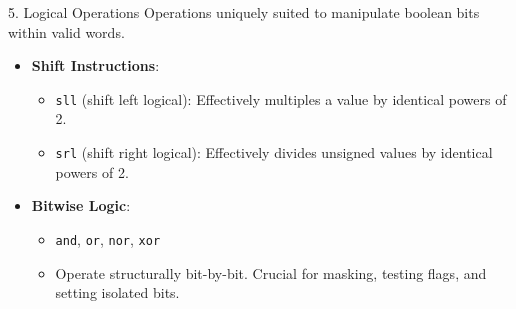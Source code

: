 \documentclass[aspectratio=169]{beamer}
\begin{document}
\begin{frame}{5. Logical Operations}
Operations uniquely suited to manipulate boolean bits within valid words.
\vspace{0.3cm}
\begin{itemize}
    \item \textbf{Shift Instructions}:
    \begin{itemize}
        \item \texttt{sll} (shift left logical): Effectively multiples a value by identical powers of 2.
        \item \texttt{srl} (shift right logical): Effectively divides unsigned values by identical powers of 2.
    \end{itemize}
    \vspace{0.3cm}
    \item \textbf{Bitwise Logic}:
    \begin{itemize}
        \item \texttt{and}, \texttt{or}, \texttt{nor}, \texttt{xor} 
        \item Operate structurally bit-by-bit. Crucial for masking, testing flags, and setting isolated bits.
    \end{itemize}
\end{itemize}
\end{frame}
\end{document}
